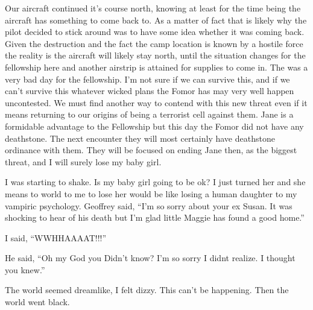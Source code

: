 Our aircraft continued it's course north, knowing at least for the time being the aircraft has something to come back to. As a matter of fact that is likely why the pilot decided to stick around was to have some idea whether it was coming back. Given the destruction and the fact the camp location is known by a hostile force the reality is the aircraft will likely stay north, until the situation changes for the fellowship here and another airstrip is attained for supplies to come in. The was a very bad day for the fellowship. I'm not sure if we can survive this, and if we can't survive this whatever wicked plans the Fomor has may very well happen uncontested. We must find another way to contend with this new threat even if it means returning to our origins of being a terrorist cell against them. Jane is a formidable advantage to the Fellowship but this day the Fomor did not have any deathstone. The next encounter they will most certainly have deathstone ordinance with them. They will be focused on ending Jane then, as the biggest threat, and I will surely lose my baby girl.

I was starting to shake. Is my baby girl going to be ok? I just turned her and she means to world to me to lose her would be like losing a human daughter to my vampiric psychology. Geoffrey said,  ``I'm so sorry about your ex Susan. It was shocking to hear of his death but I'm glad little Maggie has found a good home.''

I said, ``WWHHAAAAT!!!''

He said, ``Oh my God you Didn't know? I'm so sorry I didnt realize. I thought you knew.''

The world seemed dreamlike, I felt dizzy. This can't be happening. Then the world went black.


 
